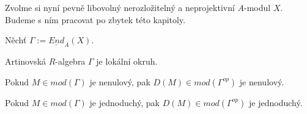      Zvolme si nyní pevně libovolný nerozložitelný a neprojektivní $A$-modul 
     $X$. Budeme s ním pracovat po zbytek této kapitoly.
  
     \begin{dfn}
       Něchť $\Gamma:=\underline{End}_A(X)$.
     \end{dfn}
     
     \begin{lem}\label{lem-D-na-jednoduchych}
     \begin{description}
       \item
       \item[(a)] Artinovská $R$-algebra $\Gamma$ je lokální okruh. 
       \item[(b)] Pokud $M\in mod(\Gamma)$ je nenulový, pak $D(M)\in mod(\Gamma^{op})$ je nenulový. 
       \item[(c)] Pokud $M\in mod(\Gamma)$ je jednoduchý, pak $D(M)\in mod(\Gamma^{op})$ je jednoduchý. 
      \end{description} 
     \end{lem}
